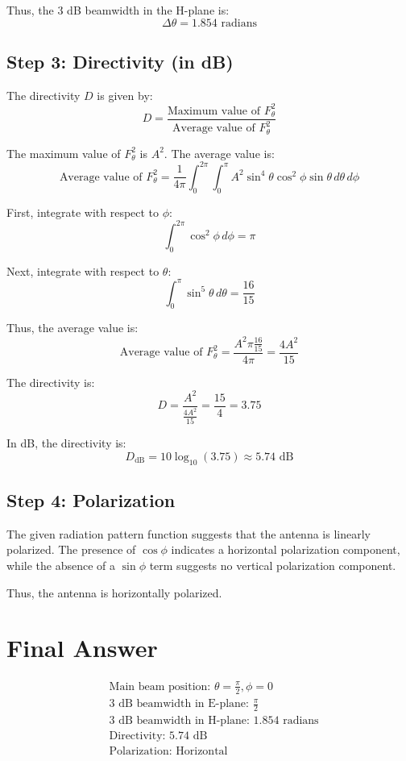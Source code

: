 \documentclass[cn,12pt]{homework}
\begin{document}
\begin{solution}
Thus, the 3 dB beamwidth in the H-plane is:
\[ \Delta \theta = 1.854 \text{ radians} \]

\subsection*{Step 3: Directivity (in dB)}
The directivity \( D \) is given by:
\[ D = \frac{\text{Maximum value of } F_\theta^2}{\text{Average value of } F_\theta^2} \]

The maximum value of \( F_\theta^2 \) is \( A^2 \). The average value is:
\[ \text{Average value of } F_\theta^2 = \frac{1}{4\pi} \int_0^{2\pi} \int_0^\pi A^2 \sin^4 \theta \cos^2 \phi \sin \theta \, d\theta \, d\phi \]

First, integrate with respect to \( \phi \):
\[ \int_0^{2\pi} \cos^2 \phi \, d\phi = \pi \]

Next, integrate with respect to \( \theta \):
\[ \int_0^\pi \sin^5 \theta \, d\theta = \frac{16}{15} \]

Thus, the average value is:
\[ \text{Average value of } F_\theta^2 = \frac{A^2 \pi \frac{16}{15}}{4\pi} = \frac{4A^2}{15} \]

The directivity is:
\[ D = \frac{A^2}{\frac{4A^2}{15}} = \frac{15}{4} = 3.75 \]

In dB, the directivity is:
\[ D_{\text{dB}} = 10 \log_{10}(3.75) \approx 5.74 \text{ dB} \]

\subsection*{Step 4: Polarization}
The given radiation pattern function suggests that the antenna is linearly polarized. The presence of \( \cos \phi \) indicates a horizontal polarization component, while the absence of a \( \sin \phi \) term suggests no vertical polarization component.

Thus, the antenna is horizontally polarized.

\section*{Final Answer}
\[
\boxed{
\begin{aligned}
&\text{Main beam position: } \theta = \frac{\pi}{2}, \phi = 0 \\
&\text{3 dB beamwidth in E-plane: } \frac{\pi}{2} \\
&\text{3 dB beamwidth in H-plane: } 1.854 \text{ radians} \\
&\text{Directivity: } 5.74 \text{ dB} \\
&\text{Polarization: Horizontal}
\end{aligned}
}
\]
  
\end{solution}
\end{document}

